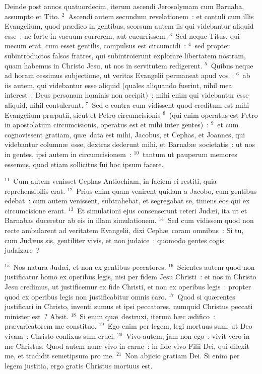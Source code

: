 \lettrine[lines=10,image=true,loversize=0.05,lraise=-0.03]{D}{}einde post annos quatuordecim, iterum ascendi Jerosolymam cum Barnaba, assumpto et Tito.
${}^{2}$~Ascendi autem secundum revelationem~: et contuli cum illis Evangelium, quod pr\ae dico in gentibus, seorsum autem iis qui videbantur aliquid esse~: ne forte in vacuum currerem, aut cucurrissem.
${}^{3}$~Sed neque Titus, qui mecum erat, cum esset gentilis, compulsus est circumcidi~:
${}^{4}$~sed propter subintroductos falsos fratres, qui subintroierunt explorare libertatem nostram, quam habemus in Christo Jesu, ut nos in servitutem redigerent.
${}^{5}$~Quibus neque ad horam cessimus subjectione, ut veritas Evangelii permaneat apud vos~:
${}^{6}$~ab iis autem, qui videbantur esse aliquid (quales aliquando fuerint, nihil mea interest~: Deus personam hominis non accipit)~: mihi enim qui videbantur esse aliquid, nihil contulerunt.
${}^{7}$~Sed e contra cum vidissent quod creditum est mihi Evangelium pr\ae putii, sicut et Petro circumcisionis
${}^{8}$~(qui enim operatus est Petro in apostolatum circumcisionis, operatus est et mihi inter gentes)~:
${}^{9}$~et cum cognovissent gratiam, qu\ae\ data est mihi, Jacobus, et Cephas, et Joannes, qui videbantur column\ae\ esse, dextras dederunt mihi, et Barnab\ae\ societatis~: ut nos in gentes, ipsi autem in circumcisionem~:
${}^{10}$~tantum ut pauperum memores essemus, quod etiam sollicitus fui hoc ipsum facere.


${}^{11}$~Cum autem venisset Cephas Antiochiam, in faciem ei restiti, quia reprehensibilis erat.
${}^{12}$~Prius enim quam venirent quidam a Jacobo, cum gentibus edebat~: cum autem venissent, subtrahebat, et segregabat se, timens eos qui ex circumcisione erant.
${}^{13}$~Et simulationi ejus consenserunt ceteri Jud\ae i, ita ut et Barnabas duceretur ab eis in illam simulationem.
${}^{14}$~Sed cum vidissem quod non recte ambularent ad veritatem Evangelii, dixi Ceph\ae\ coram omnibus~: Si tu, cum Jud\ae us sis, gentiliter vivis, et non judaice~: quomodo gentes cogis judaizare~?


${}^{15}$~Nos natura Jud\ae i, et non ex gentibus peccatores.
${}^{16}$~Scientes autem quod non justificatur homo ex operibus legis, nisi per fidem Jesu Christi~: et nos in Christo Jesu credimus, ut justificemur ex fide Christi, et non ex operibus legis~: propter quod ex operibus legis non justificabitur omnis caro.
${}^{17}$~Quod si qu\ae rentes justificari in Christo, inventi sumus et ipsi peccatores, numquid Christus peccati minister est~? Absit.
${}^{18}$~Si enim qu\ae\ destruxi, iterum h\ae c \ae difico~: pr\ae varicatorem me constituo.
${}^{19}$~Ego enim per legem, legi mortuus sum, ut Deo vivam~: Christo confixus sum cruci.
${}^{20}$~Vivo autem, jam non ego~: vivit vero in me Christus. Quod autem nunc vivo in carne~: in fide vivo Filii Dei, qui dilexit me, et tradidit semetipsum pro me.
${}^{21}$~Non abjicio gratiam Dei. Si enim per legem justitia, ergo gratis Christus mortuus est.


